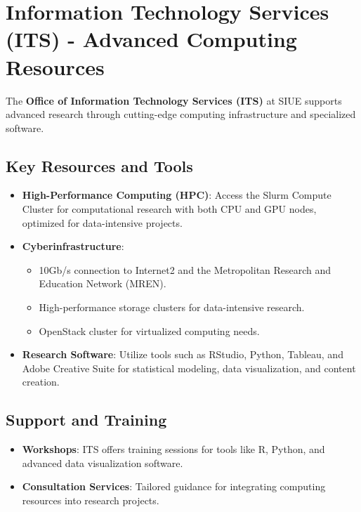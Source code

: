 \documentclass[
]{book}
\providecommand{\tightlist}{%
  \setlength{\itemsep}{0pt}\setlength{\parskip}{0pt}}
\begin{document}
\section{Information Technology Services (ITS) - Advanced Computing Resources}\label{information-technology-services-its---advanced-computing-resources}

The \textbf{Office of Information Technology Services (ITS)} at SIUE supports advanced research through cutting-edge computing infrastructure and specialized software.

\subsection*{Key Resources and Tools}\label{key-resources-and-tools}

\begin{itemize}
\tightlist
\item
  \textbf{High-Performance Computing (HPC)}: Access the Slurm Compute Cluster for computational research with both CPU and GPU nodes, optimized for data-intensive projects.
\item
  \textbf{Cyberinfrastructure}:

  \begin{itemize}
  \tightlist
  \item
    10Gb/s connection to Internet2 and the Metropolitan Research and Education Network (MREN).
  \item
    High-performance storage clusters for data-intensive research.
  \item
    OpenStack cluster for virtualized computing needs.
  \end{itemize}
\item
  \textbf{Research Software}: Utilize tools such as RStudio, Python, Tableau, and Adobe Creative Suite for statistical modeling, data visualization, and content creation.
\end{itemize}

\subsection*{Support and Training}\label{support-and-training}

\begin{itemize}
\tightlist
\item
  \textbf{Workshops}: ITS offers training sessions for tools like R, Python, and advanced data visualization software.
\item
  \textbf{Consultation Services}: Tailored guidance for integrating computing resources into research projects.
\end{itemize}
\end{document}
